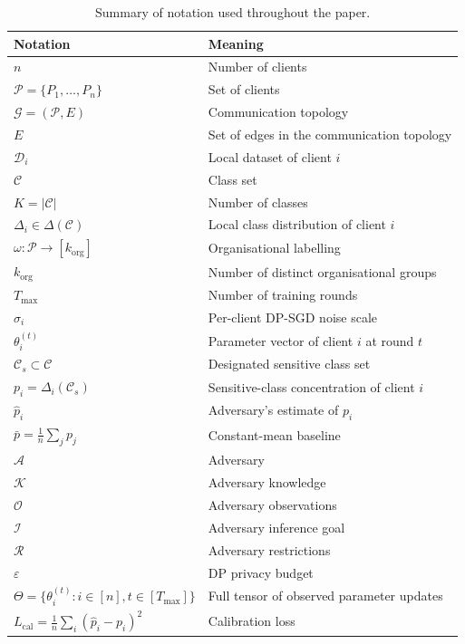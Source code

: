 \documentclass[letterpaper,journal]{IEEEtran}
\begin{document}
\begin{table}[h]
\centering
\caption{Summary of notation used throughout the paper.}
\label{tab:notation}
\begin{tabular}{@{}ll@{}}
\toprule
Notation & Meaning \\
\midrule
$n$ & Number of clients \\
$\mathcal{P} = \{P_1, \ldots, P_n\}$ & Set of clients \\
$\mathcal{G} = (\mathcal{P}, E)$ & Communication topology \\
$E$ & Set of edges in the communication topology \\
$\mathcal{D}_i$ & Local dataset of client $i$ \\
$\mathcal{C}$ & Class set \\
$K = |\mathcal{C}|$ & Number of classes \\
$\Delta_i \in \Delta(\mathcal{C})$ & Local class distribution of client $i$ \\
$\omega : \mathcal{P} \to [k_{\mathrm{org}}]$ & Organisational labelling \\
$k_{\mathrm{org}}$ & Number of distinct organisational groups \\
$T_{\max}$ & Number of training rounds \\
$\sigma_i$ & Per-client DP-SGD noise scale \\
$\theta_i^{(t)}$ & Parameter vector of client $i$ at round $t$ \\
$\mathcal{C}_s \subset \mathcal{C}$ & Designated sensitive class set \\
$p_i = \Delta_i(\mathcal{C}_s)$ & Sensitive-class concentration of client $i$ \\
$\hat{p}_i$ & Adversary's estimate of $p_i$ \\
$\bar{p} = \frac{1}{n}\sum_j p_j$ & Constant-mean baseline \\
$\mathcal{A}$ & Adversary \\
$\mathcal{K}$ & Adversary knowledge \\
$\mathcal{O}$ & Adversary observations \\
$\mathcal{I}$ & Adversary inference goal \\
$\mathcal{R}$ & Adversary restrictions \\
$\varepsilon$ & DP privacy budget \\
$\Theta = \{\theta_i^{(t)} : i \in [n], t \in [T_{\max}]\}$ & Full tensor of observed parameter updates \\
$L_{\text{cal}} = \frac{1}{n}\sum_i (\hat{p}_i - p_i)^2$ & Calibration loss \\

\end{tabular}
\end{table}
\end{document}
